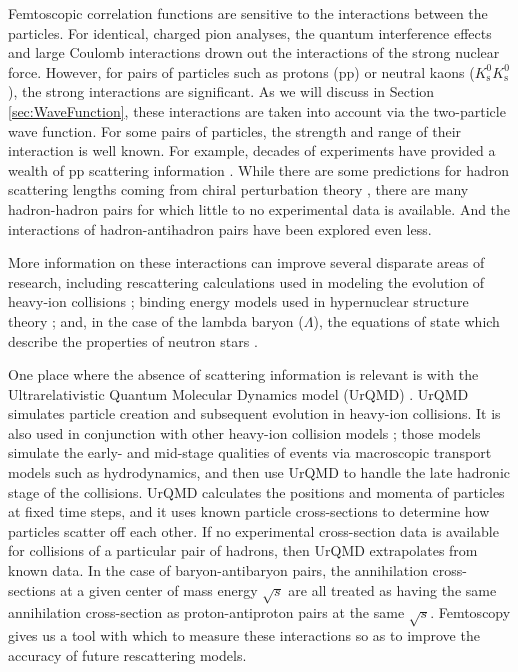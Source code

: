 Femtoscopic correlation functions are sensitive to the interactions between the particles.
For identical, charged pion analyses, the quantum interference effects and large Coulomb interactions drown out the interactions of the strong nuclear force.
However, for pairs of particles such as protons (pp) or neutral kaons ($K^0_\mathrm{s}K^0_\mathrm{s}$), the strong interactions are significant.
As we will discuss in Section \ref{sec:WaveFunction}, these interactions are taken into account via the two-particle wave function.
For some pairs of particles, the strength and range of their interaction is well known. For example, decades of experiments have provided a wealth of pp scattering information \cite{Perez:2013jpa}.
While there are some predictions for hadron scattering lengths coming from chiral perturbation theory \cite{Mai:2009ce}, there are many hadron-hadron pairs for which little to no experimental data is available. And the interactions of hadron-antihadron pairs have been explored even less.

More information on these interactions can improve several disparate areas of research, including rescattering calculations used in modeling the evolution of heavy-ion collisions \cite{Bleicher:1999xi}; binding energy models used in hypernuclear structure theory \cite{Hiyama:2002yj,Filikhin:2002wm}; and, in the case of the lambda baryon ($\Lambda$), the equations of state which describe the properties of neutron stars \cite{SchaffnerBielich:2008kb,Wang:2010gr}.

One place where the absence of scattering information is relevant is with the Ultrarelativistic Quantum Molecular Dynamics model (UrQMD) \cite{Bleicher:1999xi}. UrQMD simulates particle creation and subsequent evolution in heavy-ion collisions.
It is also used in conjunction with other heavy-ion collision models \cite{Bass:2000ib,Ryu:2012at,Song:2013qma}; those models simulate the early- and mid-stage qualities of events via macroscopic transport models such as hydrodynamics, and then use UrQMD to handle the late hadronic stage of the collisions.
UrQMD calculates the positions and momenta of particles at fixed time steps, and it uses known particle cross-sections to determine how particles scatter off each other.
If no experimental cross-section data is available for collisions of a particular pair of hadrons, then UrQMD extrapolates from known data.
In the case of baryon-antibaryon pairs, the annihilation cross-sections at a given center of mass energy $\sqrt{s}$ are all treated as having the same annihilation cross-section as proton-antiproton pairs at the same $\sqrt{s}$.
Femtoscopy gives us a tool with which to measure these interactions so as to improve the accuracy of future rescattering models.

